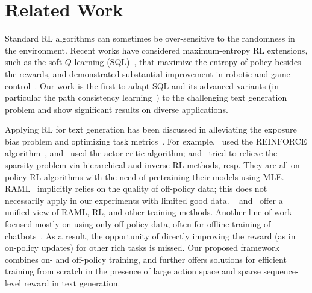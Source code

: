 \section{Related Work}

Standard RL algorithms
can sometimes be over-sensitive to the randomness in the environment. Recent works have considered maximum-entropy RL extensions, such as the soft $Q$-learning (SQL)~\citep{haarnoja2017reinforcement,nachum2017bridging,schulman2017equivalence}, that maximize the entropy of policy besides the rewards, and demonstrated substantial improvement in  robotic and game control~\citep{ziebart2008maximum,ODonoghue2017CombiningPG,nachum2018trustpcl,eysenbach2021maximum}.
Our work is the first to adapt SQL and its advanced variants (in particular the path consistency learning~\citep{nachum2017bridging}) to the challenging text generation problem and show significant results on diverse applications.

Applying RL for text generation has been discussed in alleviating the exposure bias problem and optimizing task metrics~\citep{guo2015generating,li2016deep,wu2016google,rennie2017self,paulus2018a,chen2018fast,liu2020data,pang2021amortized}. For example,~\citet{ranzato2015sequence} used the REINFORCE algorithm~\citep{williams1992simple}, and~\citet{bahdanau2016actor} used the actor-critic algorithm; \citet{guo2018long} and~\citet{shi2018toward} tried to relieve the sparsity problem via hierarchical and inverse RL methods, resp. They are all on-policy RL algorithms with the need of pretraining their models using MLE. RAML~\cite{norouzi2016reward} implicitly relies on the quality of off-policy data; this does not necessarily apply in our experiments with limited good data.%
~\citet{tan2018connecting} and~\citet{hu2022standard} offer a unified view of RAML, RL, and other training methods.
Another line of work focused mostly on using only off-policy data, often for offline training of chatbots~\citep{kandasamy2016batch,zhou2017end,jaques2020human,pang2021text}. As a result, the opportunity of directly improving the reward (as in on-policy updates) for other rich tasks is missed. Our proposed framework combines on- and off-policy training, and further offers solutions for efficient training from scratch in the presence of large action space and sparse sequence-level reward in text generation.

